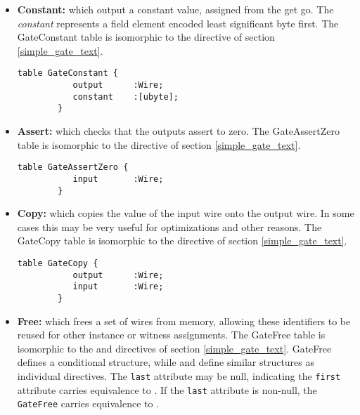 \begin{itemize}[label={}]
  \item \textbf{Constant:} which output a constant value, assigned from the get go.
    The \textit{constant} represents a field element encoded least significant byte first. The \textsf{GateConstant} table is isomorphic to the  directive of section \ref{simple_gate_text}.

    \begin{lstlisting}[style=fbslisting]
        table GateConstant {
           output      :Wire;
           constant    :[ubyte];
        }
    \end{lstlisting}

  \item \textbf{Assert:} which checks that the outputs assert to zero. The \textsf{GateAssertZero} table is isomorphic to the  directive of section \ref{simple_gate_text}.

    \begin{lstlisting}[style=fbslisting]
        table GateAssertZero {
           input       :Wire;
        }
    \end{lstlisting}

  \item \textbf{Copy:} which copies the value of the input wire onto the output wire. In some cases this may be very useful for optimizations and other reasons. The \textsf{GateCopy} table is isomorphic to the  directive of section \ref{simple_gate_text}.

    \begin{lstlisting}[style=fbslisting]
        table GateCopy {
           output      :Wire;
           input       :Wire;
        }
    \end{lstlisting}

  \item \textbf{Free:} which frees a set of wires from memory, allowing these identifiers to be reused for other instance or witness assignments. The \textsf{GateFree} table is isomorphic to the  and  directives of section \ref{simple_gate_text}.
    \textsf{GateFree} defines a conditional structure, while  and  define similar structures as individual directives.
    The \texttt{last} attribute may be null, indicating the \texttt{first} attribute carries equivalence to . If the \texttt{last} attribute is non-null, the \texttt{GateFree} carries equivalence to .


\end{itemize}

